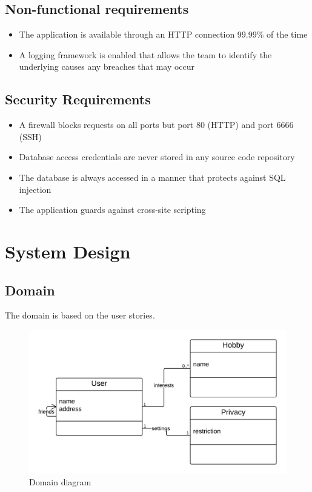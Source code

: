 \documentclass[a4paper]{article}
\begin{document}
\subsection{Non-functional requirements}
\begin{itemize}
\item The application is available through an HTTP connection 99.99\% of the time
\item A logging framework is enabled that allows the team to identify the underlying causes any breaches that may occur
\end{itemize}

\subsection{Security Requirements}
\begin{itemize}
\item A firewall blocks requests on all ports but port 80 (HTTP) and port 6666 (SSH)
\item Database access credentials are never stored in any source code repository
\item The database is always accessed in a manner that protects against SQL injection
\item The application guards against cross-site scripting
\end{itemize}

\section{System Design}
\subsection{Domain}
The domain is based on the user stories.


\begin{figure}[h!]
\centering
\includegraphics[scale=0.3]{Domain}
\caption{Domain diagram}
\label{fig:domain_diagram}
\end{figure}
\end{document}
